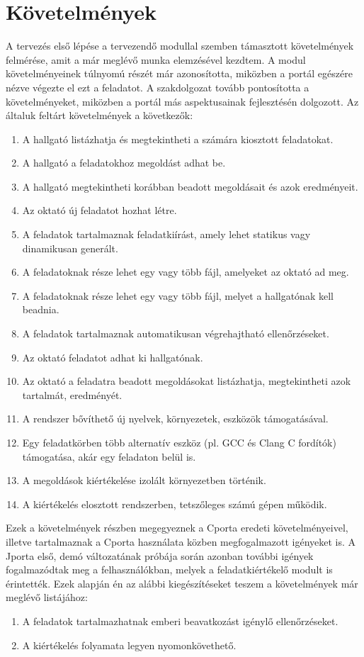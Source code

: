\section{Követelmények}
A tervezés első lépése a tervezendő modullal szemben támasztott követelmények felmérése, amit a már meglévő munka elemzésével kezdtem.
A modul követelményeinek túlnyomú részét \cite{Ory13} már azonosította, miközben a portál egészére nézve végezte el ezt a feladatot.
A \cite{Kalman14} szakdolgozat tovább pontosította a követelményeket, miközben a portál más aspektusainak fejlesztésén dolgozott.
Az általuk feltárt követelmények a következők:
\begin{enumerate}
    \item A hallgató listázhatja és megtekintheti a számára kiosztott feladatokat.
    \item A hallgató a feladatokhoz megoldást adhat be.
    \item A hallgató megtekintheti korábban beadott megoldásait és azok eredményeit.
    \item Az oktató új feladatot hozhat létre.
    \item \label{item:specification} A feladatok tartalmaznak feladatkiírást, amely lehet statikus vagy dinamikusan generált.
    \item A feladatoknak része lehet egy vagy több fájl, amelyeket az oktató ad meg.
    \item A feladatoknak része lehet egy vagy több fájl, melyet a hallgatónak kell beadnia.
    \item A feladatok tartalmaznak automatikusan végrehajtható ellenőrzéseket.
    \item Az oktató feladatot adhat ki hallgatónak.
    \item Az oktató a feladatra beadott megoldásokat listázhatja, megtekintheti azok tartalmát, eredményét.
    \item A rendszer bővíthető új nyelvek, környezetek, eszközök támogatásával.
    \item Egy feladatkörben több alternatív eszköz (pl. GCC és Clang C fordítók) támogatása, akár egy feladaton belül is.
    \item \label{item:isolation} A megoldások kiértékelése izolált környezetben történik.
    \item A kiértékelés elosztott rendszerben, tetszőleges számú gépen működik.
\end{enumerate}
Ezek a követelmények részben megegyeznek a Cporta eredeti követelményeivel, illetve tartalmaznak a Cporta használata közben megfogalmazott igényeket is.
A Jporta első, demó változatának próbája során azonban további igények fogalmazódtak meg a felhasználókban, melyek a feladatkiértékelő modult is érintették.
Ezek alapján én az alábbi kiegészítéseket teszem a követelmények már meglévő listájához:
\begin{enumerate}[resume]
    \item \label{item:manual} A feladatok tartalmazhatnak emberi beavatkozást igénylő ellenőrzéseket.
    \item \label{item:traceability} A kiértékelés folyamata legyen nyomonkövethető.
\end{enumerate}

